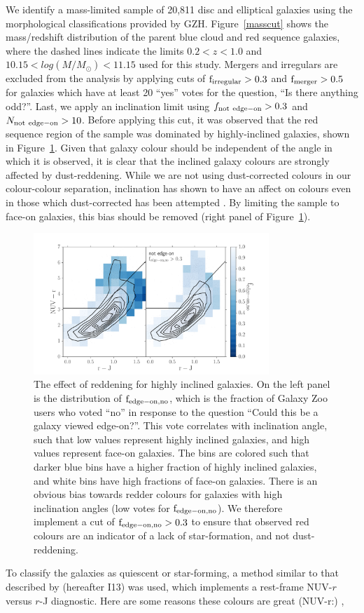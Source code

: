 \documentclass[useAMS,usenatbib]{mn2e}
\begin{document}
We identify a mass-limited sample of 20,811 disc and elliptical galaxies using the morphological classifications provided by GZH. Figure~\ref{masscut} shows the mass/redshift distribution of the parent blue cloud and red sequence galaxies, where the dashed lines indicate the limits $0.2<z<1.0$ and $10.15<log(M/M_{\odot})<11.15$ used for this study. Mergers and irregulars are excluded from the analysis by applying cuts of $\rm f_{irregular} > 0.3$ and $\rm f_{merger} > 0.5$ for galaxies which have at least 20 ``yes'' votes for the question, ``Is there anything odd?''. Last, we apply an inclination limit using $f_{\rm not~edge-on} > 0.3$ and $N_{\rm not~edge-on}>10$. Before applying this cut, it was observed that the red sequence region of the sample was dominated by highly-inclined galaxies, shown in Figure~\ref{fig:edgeon}. Given that galaxy colour should be independent of the angle in which it is observed, it is clear that the inclined galaxy colours are strongly affected by dust-reddening. While we are not using dust-corrected colours in our colour-colour separation, inclination has shown to have an affect on colours even in those which dust-corrected has been attempted \citep{Morselli2016a,Devour2017}. By limiting the sample to face-on galaxies, this bias should be removed (right panel of Figure~\ref{fig:edgeon}). 
 
\begin{figure}
\centering
\includegraphics[width=3.5in,trim={1cm 0cm 1cm 1cm},clip]{figures/edgeon_colorcolor.pdf}
\caption{The effect of reddening for highly inclined galaxies. On the left panel is the distribution of $\rm f_{edge-on,no}$, which is the fraction of Galaxy Zoo users who voted ``no'' in response to the question ``Could this be a galaxy viewed edge-on?''. This vote correlates with inclination angle, such that low values represent highly inclined galaxies, and high values represent face-on galaxies. The bins are colored such that darker blue bins have a higher fraction of highly inclined galaxies, and white bins have high fractions of face-on galaxies. There is an obvious bias towards redder colours for galaxies with high inclination angles (low votes for $\rm f_{edge-on,no}$). We therefore implement a cut of $\rm f_{edge-on,no}>0.3$ to ensure that observed red colours are an indicator of a lack of star-formation, and not dust-reddening. }
\label{fig:edgeon}
\end{figure}
To classify the galaxies as quiescent or star-forming, a method similar to that described by \citet{Ilbert2013} (hereafter I13) was used, which implements a rest-frame NUV-$r$ versus $r$-J diagnostic. Here are some reasons these colours are great (NUV-r:) \citep{Arnouts2007a,Salim2005a,Wyder2007},\citep{Martin2007}
\end{document}
